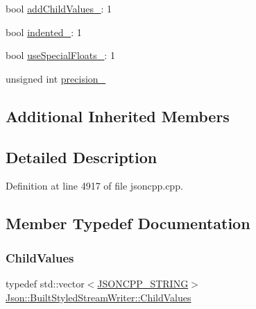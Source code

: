 \begin{DoxyCompactItemize}
\item 
bool \hyperlink{struct_json_1_1_built_styled_stream_writer_abed9cc31da503b48798e7cea68c42e16}{add\+Child\+Values\+\_\+}\+: 1
\item 
bool \hyperlink{struct_json_1_1_built_styled_stream_writer_a6aa0ad023e623f600103631a6bca6d10}{indented\+\_\+}\+: 1
\item 
bool \hyperlink{struct_json_1_1_built_styled_stream_writer_a6f1b8694b4eb17ab8c34f6d6dd8c8a4a}{use\+Special\+Floats\+\_\+}\+: 1
\item 
unsigned int \hyperlink{struct_json_1_1_built_styled_stream_writer_a6373d8d0ae4741b64e3904e4db0eef46}{precision\+\_\+}
\end{DoxyCompactItemize}
\subsection*{Additional Inherited Members}


\subsection{Detailed Description}


Definition at line 4917 of file jsoncpp.\+cpp.



\subsection{Member Typedef Documentation}
\mbox{\label{struct_json_1_1_built_styled_stream_writer_a63196b38400e5ce452f65ce856d47b6f}} 
\subsubsection{\texorpdfstring{Child\+Values}{ChildValues}}
{\footnotesize\ttfamily typedef std\+::vector$<$\hyperlink{json_8h_a1e723f95759de062585bc4a8fd3fa4be}{J\+S\+O\+N\+C\+P\+P\+\_\+\+S\+T\+R\+I\+NG}$>$ \hyperlink{struct_json_1_1_built_styled_stream_writer_a63196b38400e5ce452f65ce856d47b6f}{Json\+::\+Built\+Styled\+Stream\+Writer\+::\+Child\+Values}\hspace{0.3cm}{\ttfamily [private]}}



